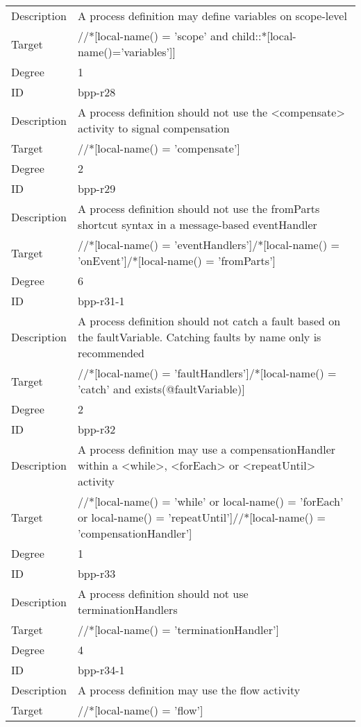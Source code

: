 \begin{center}
\begin{tiny}
\begin{longtable}{p{}|p{}}
\myrowcolour
Description &A process definition may define variables on scope-level\\
Target & //*[local-name() = 'scope' and child::*[local-name()='variables']]\\
\myrowcolour
Degree & 1\\
\midrule
ID & bpp-r28\\
\myrowcolour
Description &A process definition should not use the <compensate> activity to signal compensation\\
Target & //*[local-name() = 'compensate']\\
\myrowcolour
Degree & 2\\
\midrule
ID & bpp-r29\\
\myrowcolour
Description &A process definition should not use the fromParts shortcut syntax in a message-based eventHandler\\
Target & //*[local-name() = 'eventHandlers']/*[local-name() = 'onEvent']/*[local-name() = 'fromParts']\\
\myrowcolour
Degree & 6\\
\midrule
ID & bpp-r31-1\\
\myrowcolour
Description &A process definition should not catch a fault based on the faultVariable. Catching faults by name only is recommended\\
Target & //*[local-name() = 'faultHandlers']/*[local-name() = 'catch' and exists(@faultVariable)]\\
\myrowcolour
Degree & 2\\
\midrule
ID & bpp-r32\\
\myrowcolour
Description &A process definition may use a compensationHandler within a <while>, <forEach> or <repeatUntil> activity\\
Target & //*[local-name() = 'while' or local-name() = 'forEach' or local-name() = 'repeatUntil']//*[local-name() = 'compensationHandler']\\
\myrowcolour
Degree & 1\\
\midrule
ID & bpp-r33\\
\myrowcolour
Description &A process definition should not use terminationHandlers\\
Target & //*[local-name() = 'terminationHandler']\\
\myrowcolour
Degree & 4\\
\midrule
ID & bpp-r34-1\\
\myrowcolour
Description &A process definition may use the flow activity\\
Target & //*[local-name() = 'flow']\\

\end{longtable}
\end{tiny}
\end{center}
